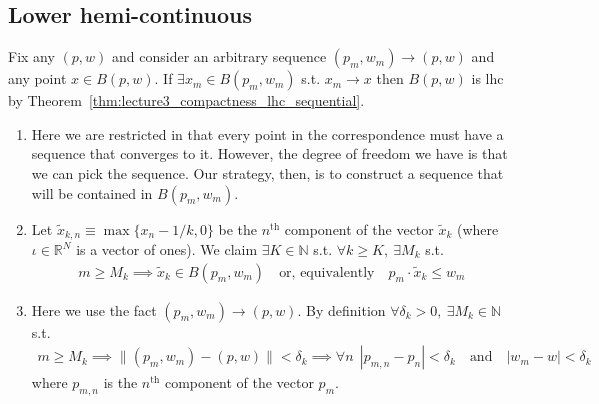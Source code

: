 \documentclass{article}
\newcommand{\R}{\mathbb{R}}
\newcommand{\N}{\mathbb{N}}
\theoremstyle{mythm}
\theoremstyle{mydef}
\begin{document}
\subsection{Lower hemi-continuous}
\label{ssub:appendix_lower_hemi_continuous}
Fix any $(p, w)$ and consider an arbitrary sequence $(p_m, w_m) \to (p, w)$ and any point $x \in B(p, w)$. If $\exists x_m \in B(p_m, w_m)$ s.t. $x_m \to x$ then $B(p, w)$ is lhc by Theorem~\ref{thm:lecture3_compactness_lhc_sequential}.
\begin{enumerate}
  \item Here we are restricted in that every point in the correspondence must have a sequence that converges to it. However, the degree of freedom we have is that we can pick the sequence. Our strategy, then, is to construct a sequence that will be contained in $B(p_m, w_m)$.

  \item Let $\widetilde{x}_{k,n} \equiv \max\{x_n - 1/k, 0\}$ be the $n^{\text{th}}$ component of the vector $\widetilde{x}_k$ (where $\iota\in\R^N$ is a vector of ones). We claim $\exists K\in\N$ s.t. $\forall k \geq K, ~ \exists M_k$ s.t.
    \begin{align*}
      m \ge M_k
      \implies
      \widetilde{x}_k
      \in
      B(p_m, w_m)
      \quad
      \text{or, equivalently}
      \quad 
      p_m
      \cdot
      \widetilde{x}_k
      \le
      w_m
    \end{align*}

  \item Here we use the fact $(p_m, w_m) \to (p, w)$. By definition $\forall \delta_k > 0, ~ \exists M_k\in\N$ s.t.
    \begin{align*}
      m \ge M_k
      \implies
      \lVert (p_m, w_m) - (p, w) \rVert
      <
      \delta_k
      \implies
      \forall n ~~
      |p_{m,n} - p_n| < \delta_k
      \quad
      \text{and}
      \quad
      |w_m - w| < \delta_k
    \end{align*}
  where $p_{m,n}$ is the $n^{\text{th}}$ component of the vector $p_m$. 
  

\end{enumerate}
\end{document}
